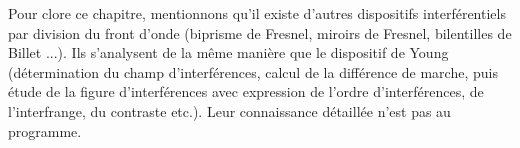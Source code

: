 \documentclass[12pt,fancy]{cours}
\begin{document}
\bigskip
Pour clore ce chapitre, mentionnons qu'il existe d'autres dispositifs interférentiels par division du front d'onde (biprisme de Fresnel, miroirs de Fresnel, bilentilles de Billet ...). Ils s'analysent de la même manière que le dispositif de Young (détermination du champ d'interférences, calcul de la différence de marche, puis étude de la figure d'interférences avec expression de l'ordre d'interférences, de l'interfrange, du contraste etc.). Leur connaissance détaillée n'est pas au programme.
\end{document}
